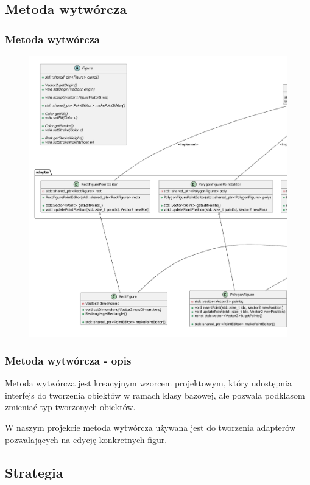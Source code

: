 \documentclass[
	11pt,]{beamer}
\begin{document}
\subsection{Metoda wytwórcza}

\begin{frame}
	\frametitle{Metoda wytwórcza}
	
	\begin{figure}
		\includegraphics[height=0.7\textheight]{figures/fac.pdf}
	\end{figure}
\end{frame}

\begin{frame}
	\frametitle{Metoda wytwórcza - opis}
	Metoda wytwórcza jest kreacyjnym wzorcem projektowym, który udostępnia interfejs do tworzenia obiektów w ramach klasy bazowej, ale pozwala podklasom zmieniać typ tworzonych obiektów.
	
	\vfill
	
	W naszym projekcie metoda wytwórcza używana jest do tworzenia adapterów pozwalających na edycję konkretnych figur.
	
\end{frame}

\subsection{Strategia}
\end{document}
